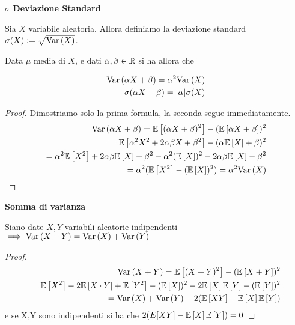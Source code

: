 \begin{defn}
    \textbf{$\sigma$ Deviazione Standard}
    
    Sia $ X $ variabile aleatoria. Allora definiamo la deviazione standard $ \sigma(X) := \sqrt{\text{Var}\left(X\right)} $. 
\end{defn}
\begin{prop}
	Data $ \mu $ media di $ X $, e dati $ \alpha, \beta \in \mathbb{R} $ si ha allora che

	\begin{equation*}
		\begin{aligned}
			\text{Var}\left(\alpha X + \beta\right) = \alpha ^2 \text{Var}\left(X\right) \\
			 \sigma(\alpha X + \beta) =| \alpha| \sigma(X) 
					\end{aligned}
	\end{equation*}
\end{prop}
\begin{proof}
Dimostriamo solo la prima formula, la seconda segue immediatamente.
\begin{equation*}
		\begin{aligned}
	    	\text{Var}\left(\alpha X + \beta\right)
          = \mathbb{E}\left[(\alpha X + \beta)^2\right] - (\mathbb{E}\left[\alpha X + \beta\right])^2 \\
			= \mathbb{E}\left[\alpha^2 X^2 + 2 \alpha \beta X + \beta^2\right] - (\alpha \mathbb{E}\left[X\right] + \beta)^2 \\
			=\alpha^2 \mathbb{E}\left[ X^2\right] + 2 \alpha \beta  \mathbb{E}\left[ X\right] + \beta^2 -
			\alpha^2 (\mathbb{E}\left[X\right])^2 -2 \alpha \beta  \mathbb{E}\left[ X\right] - \beta^2 \\
			= \alpha^2 (\mathbb{E}\left[X^2\right] - (\mathbb{E}\left[X\right])^2) = \alpha^2 \text{Var}\left(X\right)
        \end{aligned}
	\end{equation*}


\end{proof}

\begin{defn}
    \textbf{Somma di varianza} 
    
    Siano date $ X,Y $ variabili aleatorie indipendenti $ \implies \text{Var}\left(X + Y\right) = \text{Var}\left(X\right) + \text{Var}\left(Y\right) $ 
    
    \begin{proof}
		\begin{equation*}
		\begin{aligned}
		\text{Var}\left(X+Y\right) = \mathbb{E}\left[(X+Y)^2\right] - (\mathbb{E}\left[X+Y\right])^2 \\
		= \mathbb{E}\left[X^2\right] - 2\mathbb{E}\left[X \cdot Y\right] + \mathbb{E}\left[Y^2\right]-(\mathbb{E}\left[X\right])^2 - 2\mathbb{E}\left[X\right]\mathbb{E}\left[Y\right] - (\mathbb{E}\left[Y\right])^2 \\
		= \text{Var}\left(X\right) + \text{Var}\left(Y\right) + 2(\mathbb{E}\left[XY\right] - \mathbb{E}\left[X\right]\mathbb{E}\left[Y\right])\\
		\end{aligned}
		\end{equation*}
    e se X,Y sono indipendenti si ha che	$2(E[XY] - \mathbb{E}\left[X\right]\mathbb{E}\left[Y\right]) = 0$
	\end{proof}
    
\end{defn}


